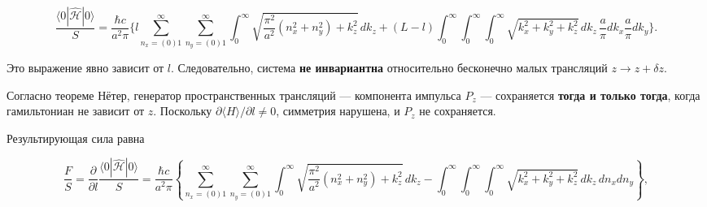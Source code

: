 \documentclass[twoside, 10pt]{article}
\begin{document}
\[
\frac{\langle 0|\hat{\mathcal{H}}|0\rangle}{S} = \frac{\hbar c}{a^2\pi} \Bigg\{
l \sum_{n_x=(0)1}^{\infty}\sum_{n_y=(0)1}^{\infty}
\int_0^{\infty} \sqrt{ \frac{\pi^2}{a^2}(n_x^2 + n_y^2) + k_z^2 } \, dk_z
+ (L - l) \int_0^{\infty}\!\!\int_0^{\infty}
\int_0^{\infty} \sqrt{k_x^2 + k_y^2 + k_z^2} \, dk_z \, \frac{a}{\pi}dk_x \frac{a}{\pi}dk_y
\Bigg\}.
\]

\begin{multicols}{2}

Это выражение явно зависит от \(l\). Следовательно, система \textbf{не инвариантна} относительно бесконечно малых трансляций \(z \to z + \delta z\).

Согласно теореме Нётер, генератор пространственных трансляций — компонента импульса \(P_z\) — сохраняется
\textbf{тогда и только тогда}, когда гамильтониан не зависит от \(z\).
Поскольку \(\partial \langle H \rangle / \partial l \neq 0\), симметрия нарушена,
и \(P_z\) не сохраняется.

Результирующая сила равна
\end{multicols}

\[
\frac{F}{S} = \frac{\partial}{\partial l} \frac{\langle 0|\hat{\mathcal{H}}|0\rangle}{S}
= \frac{\hbar c}{a^2\pi} \left\{
\sum_{n_x=(0)1}^{\infty}\sum_{n_y=(0)1}^{\infty}
\int_0^{\infty} \sqrt{ \frac{\pi^2}{a^2}(n_x^2 + n_y^2) + k_z^2 } \, dk_z
- \int_0^{\infty}\!\!\int_0^{\infty}
\int_0^{\infty} \sqrt{k_x^2 + k_y^2 + k_z^2} \, dk_z \, dn_x dn_y
\right\},
\]
\end{document}
